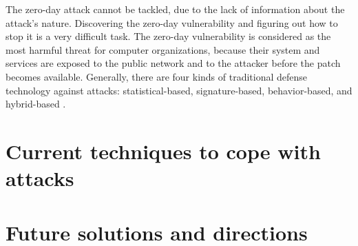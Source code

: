 \documentclass[twocolumn]{article}
\begin{document}
The zero-day attack cannot be tackled, due to the lack of information about the attack’s nature. Discovering the zero-day vulnerability and figuring out how to stop it is a very difficult task. The zero-day vulnerability is considered as the most harmful threat for computer organizations, because their system and services are exposed to the public network and to the attacker before the patch becomes available. Generally, there are four kinds of traditional defense technology against attacks: statistical-based, signature-based, behavior-based, and hybrid-based \cite{al2019zero}.
\section{Current techniques to cope with attacks}

\textcolor{red}{\lipsum[1]}

\section{Future solutions and directions}

\textcolor{red}{\lipsum[1]}


\renewcommand{\refname}{REFERENCES}


\end{document}
